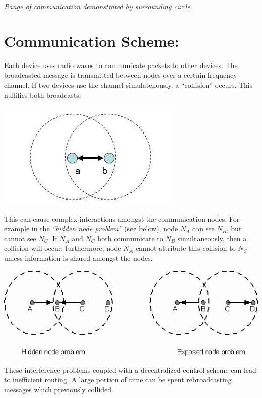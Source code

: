 \documentclass[11pt]{article}
\makeatletter
\def\maxwidth{\ifdim\Gin@nat@width>\linewidth\linewidth
    \else\Gin@nat@width\fi}
\makeatother
\begin{document}
\emph{Range of communication demonstrated by surrounding circle}

    \hypertarget{communication-scheme}{%
\section{Communication Scheme:}\label{communication-scheme}}

Each device uses radio waves to communicate packets to other devices.
The broadcasted message is transmitted between nodes over a certain
frequency channel. If two devices use the channel simulatenously, a
``collision'' occurs. This nullifies both broadcasts.

\includegraphics[width=.8\maxwidth]{interference.png}

\pagebreak

This can cause complex interactions amongst the communication nodes. For
example in the \emph{``hidden node problem''} (see below), node
\(N_{A}\) can see \(N_{B}\), but cannot see \(N_{C}\). If \(N_{A}\) and
\(N_{C}\) both communicate to \(N_{B}\) simultaneously, then a collision
will occur; furthermore, node \(N_{A}\) cannot attribute this collision
to \(N_{C}\) unless information is shared amongst the nodes.

\includegraphics[width=.8\maxwidth]{hiddennode.png}

These interference problems coupled with a decentralized control scheme
can lead to inefficient routing. A large portion of time can be spent
rebroadcasting messages which previously collided.
\end{document}
